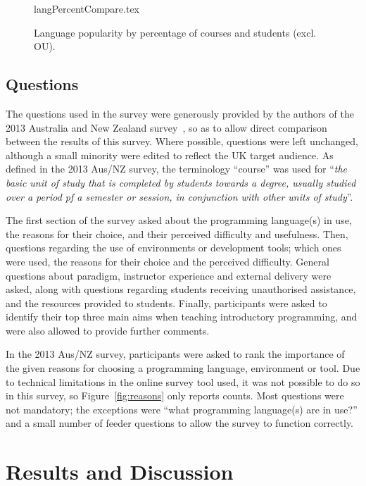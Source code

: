 \documentclass{sig-alternate}
\begin{document}
\begin{figure}
\begin{center}
{langPercentCompare.tex}
\end{center}\vskip-18pt
\caption{Language popularity by percentage of courses and students (excl. OU).\label{fig:lang}}
\end{figure}

\subsection{Questions}

The questions used in the survey were generously provided by the
authors of the 2013 Australia and New Zealand
survey~\cite{mason+cooper:2014}, so as to allow direct comparison
between the results of this survey. Where possible, questions were
left unchanged, although a small minority were edited to reflect the
UK target audience. As defined in the 2013 Aus/NZ survey, the
terminology ``course'' was used for ``{\emph{the basic unit of study that is
completed by students towards a degree, usually studied over a period
pf a semester or session, in conjunction with other units of study}}''.

The first section of the survey asked about the programming
language(s) in use, the reasons for their choice, and their perceived
difficulty and usefulness. Then, questions regarding the use of
environments or development tools; which ones were used, the reasons
for their choice and the perceived difficulty. General questions about
paradigm, instructor experience and external delivery were asked,
along with questions regarding students receiving unauthorised
assistance, and the resources provided to students. Finally,
participants were asked to identify their top three main aims when
teaching introductory programming, and were also allowed to provide
further comments.

In the 2013 Aus/NZ survey, participants were asked to rank the
importance of the given reasons for choosing a programming language,
environment or tool. Due to technical limitations in the online survey
tool used, it was not possible to do so in this survey, so
Figure~\ref{fig:reasons} only reports counts. Most questions were not
mandatory; the exceptions were ``what programming language(s) are in
use?'' and a small number of feeder questions to allow the survey to
function correctly.

\section{Results and Discussion}\label{results}
\end{document}
